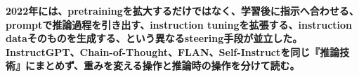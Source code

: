 \noindent\textbf{2022年には、pretrainingを拡大するだけではなく、学習後に指示へ合わせる、promptで推論過程を引き出す、instruction tuningを拡張する、instruction dataそのものを生成する、という異なるsteering手段が並立した。InstructGPT、Chain-of-Thought、FLAN、Self-Instructを同じ『推論技術』にまとめず、重みを変える操作と推論時の操作を分けて読む。}\autocite{src-0c551201e765,src-87477ad8b476,src-a17359c66f6b,src-e58f1e9c8754,src-fadb2b92c538}
